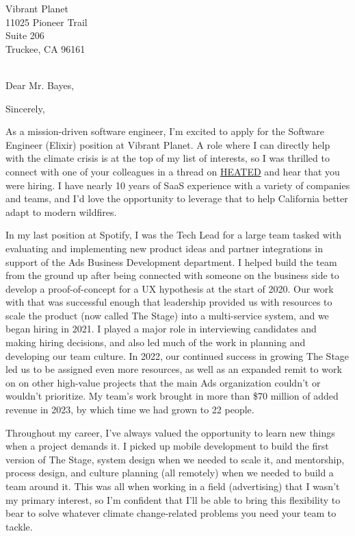 

	{Vibrant Planet
	\\11025 Pioneer Trail
    \\Suite 206
	\\Truckee, CA 96161}

\date{February 21, 2024}
\opening{\\Dear Mr. Bayes,}
\closing{Sincerely,}
\makelettertitle


As a mission-driven software engineer, I'm excited to apply for the Software Engineer (Elixir) position at Vibrant Planet.
A role where I can directly help with the climate crisis is at the top of my list of interests,
so I was thrilled to connect with one of your colleagues in a thread on \href{https://heated.world/}{HEATED} and hear that you were hiring.
I have nearly 10 years of SaaS experience with a variety of companies and teams,
and I'd love the opportunity to leverage that to help California better adapt to modern wildfires.

In my last position at Spotify, I was the Tech Lead for a large team tasked with evaluating and implementing new product ideas
and partner integrations in support of the Ads Business Development department.
I helped build the team from the ground up after being connected with someone on the business side to develop a proof-of-concept
for a UX hypothesis at the start of 2020. Our work with that was successful enough that leadership provided us with resources
to scale the product (now called The Stage) into a multi-service system, and we began hiring in 2021.
I played a major role in interviewing candidates and making hiring decisions,
and also led much of the work in planning and developing our team culture.
In 2022, our continued success in growing The Stage led us to be assigned even more resources,
as well as an expanded remit to work on on other high-value projects that the main Ads organization couldn't or wouldn't prioritize.
My team's work brought in more than \$70 million of added revenue in 2023, by which time we had grown to 22 people.

Throughout my career, I've always valued the opportunity to learn new things when a project demands it.
I picked up mobile development to build the first version of The Stage, system design when we needed to scale it,
and mentorship, process design, and culture planning (all remotely) when we needed to build a team around it.
This was all when working in a field (advertising) that I wasn't my primary interest,
so I'm confident that I'll be able to bring this flexibility to bear to solve whatever climate change-related problems
you need your team to tackle.

